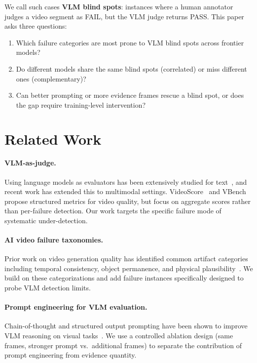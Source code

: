 \documentclass[11pt]{article}
\begin{document}
We call such cases \textbf{VLM blind spots}: instances where a human annotator judges a video segment as FAIL, but the VLM judge returns PASS. This paper asks three questions:
\begin{enumerate}
  \item Which failure categories are most prone to VLM blind spots across frontier models?
  \item Do different models share the same blind spots (correlated) or miss different ones (complementary)?
  \item Can better prompting or more evidence frames rescue a blind spot, or does the gap require training-level intervention?
\end{enumerate}

\section{Related Work}

\paragraph{VLM-as-judge.} Using language models as evaluators has been extensively studied for text~\cite{zheng2023judging}, and recent work has extended this to multimodal settings. VideoScore~\cite{he2024videoscore} and VBench~\cite{huang2024vbench} propose structured metrics for video quality, but focus on aggregate scores rather than per-failure detection. Our work targets the specific failure mode of systematic under-detection.

\paragraph{AI video failure taxonomies.} Prior work on video generation quality has identified common artifact categories including temporal consistency, object permanence, and physical plausibility~\cite{huang2024vbench}. We build on these categorizations and add failure instances specifically designed to probe VLM detection limits.

\paragraph{Prompt engineering for VLM evaluation.} Chain-of-thought and structured output prompting have been shown to improve VLM reasoning on visual tasks~\cite{wei2022chain}. We use a controlled ablation design (same frames, stronger prompt vs.\ additional frames) to separate the contribution of prompt engineering from evidence quantity.
\end{document}
